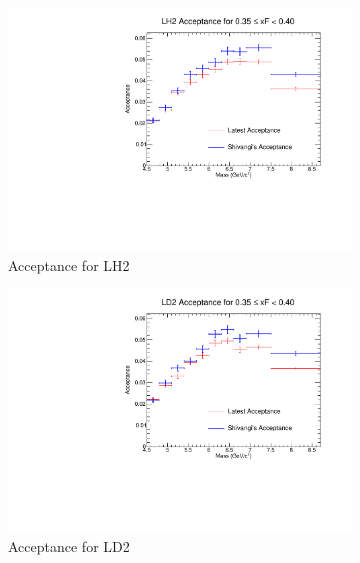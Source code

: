 \documentclass[11pt]{article}
\begin{document}
\begin{figure}[p]
    \centering
    \begin{subfigure}[b]{0.48\textwidth}
       \includegraphics[width=\linewidth]{./acceptancePlots/LH2_acceptance_xF_bin_7.pdf}
       \caption{Acceptance for LH2}
    \end{subfigure}\hfill
    \begin{subfigure}[b]{0.48\textwidth}
       \includegraphics[width=\linewidth]{./acceptancePlots/LD2_acceptance_xF_bin_7.pdf}
       \caption{Acceptance for LD2}
    \end{subfigure}
    \begin{subfigure}[b]{0.48\textwidth}

\end{subfigure}
\end{figure}
\end{document}
